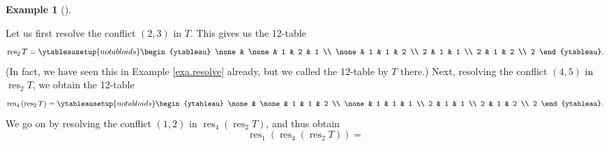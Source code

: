 \documentclass[numbers=enddot,12pt,final,onecolumn,notitlepage]{scrartcl}%
\theoremstyle{definition}
\newtheorem{exmp}[theo]{Example}
\newenvironment{example}[1][]
{\begin{exmp}[#1]\begin{leftbar}}
{\end{leftbar}\end{exmp}}
\begin{document}
\begin{example}
Let us first resolve the conflict $\left(  2,3\right)  $ in $T$. This gives us
the 12-table%
\[
\operatorname*{res}\nolimits_{2}T=%
\ytableausetup{notabloids}
\begin{ytableau}
\none& \none& 1 & 2 & 1 \\
\none& 1 & 1 & 2 \\
2 & 1 & 1 \\
2 & 1 & 2 \\
2
\end{ytableau}%
.
\]
(In fact, we have seen this in Example \ref{exa.resolve} already, but we
called the 12-table by $T$ there.) Next, resolving the conflict $\left(
4,5\right)  $ in $\operatorname*{res}\nolimits_{2}T$, we obtain the 12-table%
\[
\operatorname*{res}\nolimits_{4}\left(  \operatorname*{res}\nolimits_{2}%
T\right)  =%
\ytableausetup{notabloids}
\begin{ytableau}
\none& \none& 1 & 1 & 2 \\
\none& 1 & 1 & 1 \\
2 & 1 & 1 \\
2 & 1 & 2 \\
2
\end{ytableau}%
.
\]
We go on by resolving the conflict $\left(  1,2\right)  $ in
$\operatorname*{res}\nolimits_{4}\left(  \operatorname*{res}\nolimits_{2}%
T\right)  $, and thus obtain%
\[
\operatorname*{res}\nolimits_{1}\left(  \operatorname*{res}\nolimits_{4}%
\left(  \operatorname*{res}\nolimits_{2}T\right)  \right)  =%
\]
\end{example}
\end{document}
